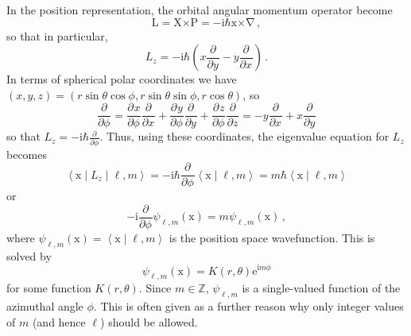 \documentclass{article}
\theoremstyle{plain}\theoremheaderfont{\normalfont\itshape}\theorembodyfont{\rmfamily}\theoremseparator{.}\newtheorem*{rem}{Remark}\newtheorem*{ex}{Example}\newtheorem*{proof}{Proof}\newtheorem*{altp}{Alternative proof}
\theoremstyle{plain}\theoremheaderfont{\normalfont\bfseries}\theorembodyfont{\rmfamily}\theoremseparator{.}\newtheorem{thm}{Theorem}[section]\newtheorem{lem}[thm]{Lemma}\newtheorem{prop}[thm]{Proposition}\newtheorem*{cor}{Corollary}\newtheorem{defn}[thm]{Definition}\newtheorem{clm}[thm]{Claim}\newtheorem{clminproof}{Claim}
\theoremstyle{break}\theoremheaderfont{\normalfont\itshape}\theorembodyfont{\rmfamily}\theoremseparator{.\medskip}\newtheorem*{proofskip}{Proof}\newtheorem*{exs}{Examples}\newtheorem*{rems}{Remarks}
\theoremstyle{break}\theoremheaderfont{\normalfont\bfseries}\theorembodyfont{\rmfamily}\theoremseparator{.\medskip}\newtheorem{lemskip}[thm]{Lemma}\newtheorem{defnskip}[thm]{Definition}\newtheorem{propskip}[thm]{Proposition}\newtheorem{thmskip}[thm]{Theorem}
\numberwithin{equation}{section}
\newcommand{\ii}{\mathrm{i}}
\newcommand{\ee}{\mathrm{e}}
\newcommand{\pdv}[3][]{\frac{\partial^{#1} #2}{{\partial #3}^{#1}}}
\newcommand{\braket}[2]{\left\langle #1 \middle| #2 \right\rangle}
\newcommand{\mel}[3]{\left\langle #1 \middle| #2 \middle| #3 \right\rangle}
\newcommand{\vb}[1]{\bm{\mathrm{#1}}}
\newcommand{\cross}{\bm{\times}}
\newcommand{\grad}{\vb{\nabla}}
\newcommand{\ZZ}{\mathbb{Z}}
\begin{document}
    In the position representation, the orbital angular momentum operator become
    \begin{equation}
        \vb{L}=\vb{X}\cross\vb{P}=-\ii\hbar\vb{x}\cross\grad\,,
    \end{equation}
    so that in particular,
    \begin{equation}
        L_z=-\ii\hbar\left(x\pdv{}{y}-y\pdv{}{x}\right)\,.
    \end{equation}
    In terms of spherical polar coordinates we have \((x,y,z)=(r\sin\theta\cos\phi,r\sin\theta\sin\phi,r\cos\theta)\), so
    \begin{equation}
        \pdv{}{\phi}=\pdv{x}{\phi}\pdv{}{x}+\pdv{y}{\phi}\pdv{}{y}+\pdv{z}{\phi}\pdv{}{z}=-y\pdv{}{x}+x\pdv{}{y}
    \end{equation}
    so that \(L_z=-\ii\hbar\pdv{}{\phi}\). Thus, using these coordinates, the eigenvalue equation for \(L_z\) becomes
    \begin{equation}
        \mel{\vb{x}}{L_z}{\ell,m}=-\ii\hbar\pdv{}{\phi}\braket{\vb{x}}{\ell,m}=m\hbar\braket{\vb{x}}{\ell,m}
    \end{equation}
    or
    \begin{equation}
        -\ii\pdv{}{\phi}\psi_{\ell,m}(\vb{x})=m\psi_{\ell,m}(\vb{x})\,,
    \end{equation}
    where \(\psi_{\ell,m}(\vb{x})=\braket{\vb{x}}{\ell,m}\) is the position space wavefunction. This is solved by
    \begin{equation}
        \psi_{\ell,m}(\vb{x})=K(r,\theta)\ee^{\ii m\phi}
    \end{equation}
    for some function \(K(r,\theta)\). Since \(m\in\ZZ\), \(\psi_{\ell,m}\) is a single-valued function of the azimuthal angle \(\phi\). This is often given as a further reason why only integer values of \(m\) (and hence \(\ell\)) should be allowed.
\end{document}
